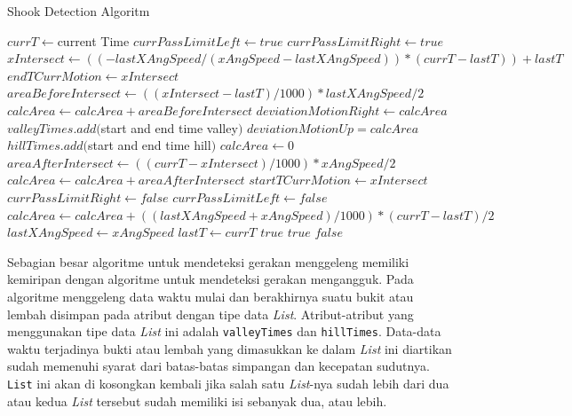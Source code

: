 \begin{algorithm}
	\caption{Shook Detection Algoritm}
	\label{alg:algoritme-pendeteksi-gerakan-menggeleng}
	\begin{algorithmic}[1]
		\State $currT \gets $current Time
			\State $currPassLimitLeft \gets true$
			\State $currPassLimitRight \gets true$
		\EndIf
			\State $xIntersect \gets ((-lastXAngSpeed / (xAngSpeed - lastXAngSpeed)) * (currT - lastT))+lastT$
			\State $endTCurrMotion \gets xIntersect$
			\State $areaBeforeIntersect \gets ((xIntersect - lastT) / 1000) * lastXAngSpeed / 2$
			\State $calcArea \gets calcArea + areaBeforeIntersect$
				\State $deviationMotionRight \gets calcArea$
					\State $valleyTimes.add($start and end time valley$)$
				\EndIf
				\State $deviationMotionUp = calcArea$
					\State $hillTimes.add($start and end time hill$)$
				\EndIf
			\EndIf
			\State $calcArea \gets 0$
			\State $areaAfterIntersect \gets ((currT - xIntersect) / 1000) * xAngSpeed / 2$ 
			\State $calcArea \gets calcArea + areaAfterIntersect$ 
			\State $startTCurrMotion \gets xIntersect$ 
			\State $currPassLimitRight \gets false$ 
			\State $currPassLimitLeft \gets false$ 
		\Else 
			\State $calcArea \gets calcArea + ((lastXAngSpeed + xAngSpeed) / 1000) * (currT - lastT) / 2$
		\EndIf
		\State $lastXAngSpeed \gets xAngSpeed$
		\State $lastT \gets currT$
			\Return $true$ 
			\Return $true$
		\Else 
			\Return $false$
		\EndIf
	\EndFunction  
	\end{algorithmic}
\end{algorithm} 

Sebagian besar algoritme untuk mendeteksi gerakan menggeleng memiliki kemiripan dengan algoritme untuk mendeteksi gerakan mengangguk. Pada algoritme menggeleng data waktu mulai dan berakhirnya suatu bukit atau lembah disimpan pada atribut dengan tipe data \textit{List}. Atribut-atribut yang menggunakan tipe data \textit{List} ini adalah \texttt{valleyTimes} dan \texttt{hillTimes}. Data-data waktu terjadinya bukti atau lembah yang dimasukkan ke dalam \textit{List} ini diartikan sudah memenuhi syarat dari batas-batas simpangan dan kecepatan sudutnya. \texttt{List} ini akan di kosongkan kembali jika salah satu \textit{List}-nya sudah lebih dari dua atau kedua \textit{List} tersebut sudah memiliki isi sebanyak dua, atau lebih. 

